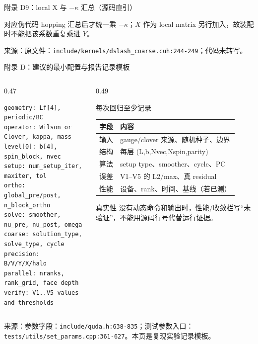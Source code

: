 \documentclass[UTF8,aspectratio=169,11pt]{ctexbeamer}
\newcommand{\source}[1]{\vspace{0.05em}\par{\raggedright\scriptsize\color{muted}来源：#1\par}}
\newcommand{\codepath}[1]{\nolinkurl{#1}}
\begin{document}
\begin{frame}[fragile,t]{附录 D9：local X 与 \(-\kappa\) 汇总（源码直引）}
  
  \begin{block}{对应伪代码}
    hopping 汇总后才统一乘 \(-\kappa\)；\(X\) 作为 local matrix 另行加入，故装配时不能把该系数重复乘进 \(Y\)。
  \end{block}
  \source{原文件：\codepath{include/kernels/dslash_coarse.cuh:244-249}；代码未转写。}
\end{frame}

\begin{frame}[fragile,t]{附录 D：建议的最小配置与报告记录模板}
  \begin{columns}[T,totalwidth=\textwidth]
    \begin{column}{0.47\textwidth}
      \begin{lstlisting}[firstnumber=1]
geometry: Lf[4], periodic/BC
operator: Wilson or Clover, kappa, mass
level[0]: b[4], spin_block, nvec
setup: num_setup_iter, maxiter, tol
ortho: global_pre/post, n_block_ortho
solve: smoother, nu_pre, nu_post, omega
coarse: solution_type, solve_type, cycle
precision: B/V/Y/X/halo
parallel: nranks, rank_grid, face depth
verify: V1..V5 values and thresholds
      \end{lstlisting}
    \end{column}
    \begin{column}{0.49\textwidth}
      \begin{block}{每次回归至少记录}
        \begin{tabularx}{\linewidth}{@{}lX@{}}
          \toprule
          字段 & 内容 \\
          \midrule
          输入 & gauge/clover 来源、随机种子、边界 \\
          结构 & 每层 (L,b,Nvec,Nspin,parity) \\
          算法 & setup type、smoother、cycle、PC \\
          误差 & V1--V5 的 L2/max、真 residual \\
          性能 & 设备、rank、时间、基线（若已测） \\
          \bottomrule
        \end{tabularx}
      \end{block}
      \begin{alertblock}{真实性}
        没有动态命令和输出时，性能/收敛栏写“未验证”，不能用源码行号代替运行证据。
      \end{alertblock}
    \end{column}
  \end{columns}
  \source{参数字段：\codepath{include/quda.h:638-835}；测试参数入口：\codepath{tests/utils/set_params.cpp:361-627}。本页是复现实验记录模板。}
\end{frame}
\end{document}
